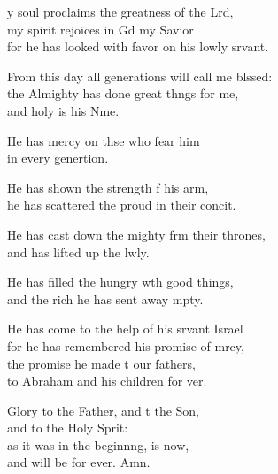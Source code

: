 \settowidth{\versewidth}{From this day all generations will call me blessed: +}
\begin{psalmverse}%
  \begin{patverse}
y soul proclaims the greatness of the Lrd,\Flex\\
my spirit rejoices in Gd my Savior\Med\\
for he has looked with favor on his lowly srvant.

From this day all generations will call me blssed:\Flex\\
the Almighty has done great th\pointup{\i}ngs for me,\Med\\
and holy is his Nme.

He has mercy on thse who fear him\Med\\
in every genertion.

He has shown the strength f his arm,\Med\\
he has scattered the proud in their concit.

He has cast down the mighty frm their thrones,\Med\\
and has lifted up the lwly.

He has filled the hungry w\pointup{\i}th good things,\Med\\
and the rich he has sent away mpty.

He has come to the help of his srvant Israel\Med\\
for he has remembered his promise of mrcy,\\
the promise he made t our fathers,\Med\\
to Abraham and his children for ver.

Glory to the Father, and t the Son,\Med\\
and to the Holy Sp\pointup{\i}rit:\\
as it was in the beginn\pointup{\i}ng, is now,\Med\\
and will be for ever. Amn.
  \end{patverse}
\end{psalmverse}
